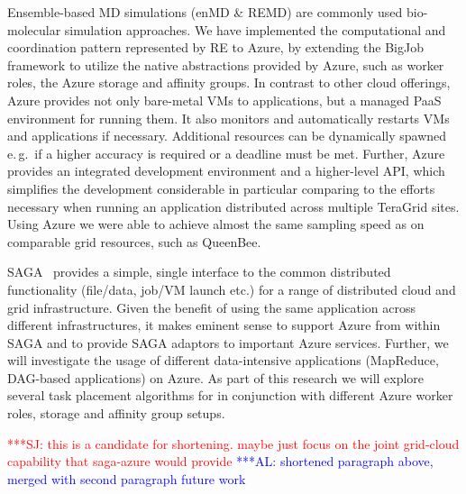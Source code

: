 \documentclass[conference,final]{IEEEtran}
\newcommand{\alnote}[1]{ {\textcolor{blue} { ***AL: #1 }}}
\newcommand{\jhanote}[1]{ {\textcolor{red} { ***SJ: #1 }}}
\newcommand{\alnote}[1]{}
\newcommand{\jhanote}[1]{}
\begin{document}
Ensemble-based MD simulations (enMD \& REMD) are commonly used
bio-molecular simulation approaches.%
We have implemented the computational and coordination pattern
represented by RE to Azure, by extending the BigJob framework to
utilize the native abstractions provided by Azure, such as worker
roles, the Azure storage and affinity groups.
In contrast to other cloud offerings, Azure provides not only
bare-metal VMs to applications, but a managed PaaS environment for
running them. It also monitors and automatically restarts VMs and
applications if necessary. Additional resources can be dynamically
spawned e.\,g.\ if a higher accuracy is required or a deadline must
be met. Further, Azure provides an integrated
development environment and a higher-level API, which simplifies the
development considerable in particular comparing to the efforts
necessary when running an application distributed across multiple
TeraGrid sites.  Using Azure we were able to achieve almost the same
sampling speed as on comparable grid resources, such as QueenBee.


SAGA~\cite{saga_url} provides a simple, single interface to the common
distributed functionality (file/data, job/VM launch etc.) for a range 
of distributed cloud and grid infrastructure. 
Given the benefit of using the same application across different 
infrastructures, it makes eminent sense to support Azure from 
within SAGA and to provide SAGA adaptors to important Azure services.
Further, we will investigate the usage of different data-intensive applications (MapReduce,
DAG-based applications)  on Azure. As part of this research we will explore 
several task placement algorithms for in conjunction with different Azure worker roles,
storage and affinity group setups.


\jhanote{this is a
  candidate for shortening. maybe just focus on the joint grid-cloud
  capability that saga-azure would provide}\alnote{shortened paragraph 
  above, merged with second paragraph future work}
  
  
\end{document}
